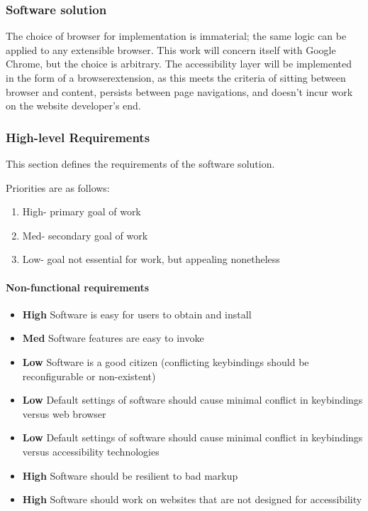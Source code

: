\documentclass[a4paper, 11pt]{article}
\begin{document}
\subsubsection{Software solution}
The choice of browser for implementation is immaterial; the same logic can be applied to any extensible browser. This work will concern itself with Google Chrome, but the choice is arbitrary.
The accessibility layer will be implemented in the form of a \gls{browserextension}, as this meets the criteria of sitting between browser and content, persists between page navigations, and doesn't incur work on the website developer's end.
\subsubsection{High-level Requirements}
This section defines the requirements of the software solution.

\def\pria{High}
\def\prib{Med}
\def\pric{Low}

Priorities are as follows:
\begin{enumerate}
\item \pria - primary goal of work
\item \prib - secondary goal of work
\item \pric - goal not essential for work, but appealing nonetheless
\end{enumerate}

\paragraph{Non-functional requirements}

\newcommand{\pritem}[2]{\item {\bfseries #1} #2}
\begin{itemize}
\pritem{\pria}{ Software is easy for users to obtain and install}
\pritem{\prib}{ Software features are easy to invoke}
\pritem{\pric}{ Software is a good citizen (conflicting \glspl{keybinding} should be reconfigurable or non-existent)}
\pritem{\pric}{ Default settings of software should cause minimal conflict in \glspl{keybinding} versus web browser}
\pritem{\pric}{ Default settings of software should cause minimal conflict in \glspl{keybinding} versus accessibility technologies}
\pritem{\pria}{ Software should be resilient to bad markup}
\pritem{\pria}{ Software should work on websites that are not designed for accessibility}
\end{itemize}
\end{document}
